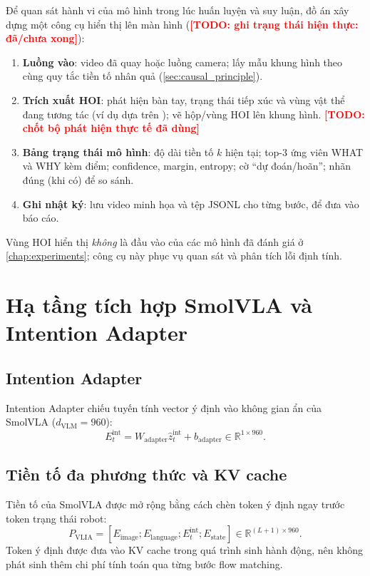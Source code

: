 \documentclass[12pt,a4paper]{report}
\newcommand{\TODO}[1]{\textcolor{red}{\textbf{[TODO: #1]}}}
\begin{document}
Để quan sát hành vi của mô hình trong lúc huấn luyện và suy luận, đồ án xây dựng một công cụ hiển thị lên màn hình (\TODO{ghi trạng thái hiện thực: đã/chưa xong}):
\begin{enumerate}
    \item \textbf{Luồng vào}: video đã quay hoặc luồng camera; lấy mẫu khung hình theo cùng quy tắc tiền tố nhân quả (\cref{sec:causal_principle}).
    \item \textbf{Trích xuất HOI}: phát hiện bàn tay, trạng thái tiếp xúc và vùng vật thể đang tương tác (ví dụ dựa trên \citep{shan2020100doh,zhang2020mediapipe}); vẽ hộp/vùng HOI lên khung hình. \TODO{chốt bộ phát hiện thực tế đã dùng}
    \item \textbf{Bảng trạng thái mô hình}: độ dài tiền tố $k$ hiện tại; top-3 ứng viên WHAT và WHY kèm điểm; confidence, margin, entropy; cờ ``dự đoán/hoãn''; nhãn đúng (khi có) để so sánh.
    \item \textbf{Ghi nhật ký}: lưu video minh họa và tệp JSONL cho từng bước, để đưa vào báo cáo.
\end{enumerate}
Vùng HOI hiển thị \emph{không} là đầu vào của các mô hình đã đánh giá ở \cref{chap:experiments}; công cụ này phục vụ quan sát và phân tích lỗi định tính.

\section{Hạ tầng tích hợp SmolVLA và Intention Adapter}

\subsection{Intention Adapter}
Intention Adapter chiếu tuyến tính vector ý định vào không gian ẩn của SmolVLA ($d_{\mathrm{VLM}}=960$):
\begin{equation}
    E_t^{\mathrm{int}} = W_{\mathrm{adapter}}\hat{z}_t^{\mathrm{int}} + b_{\mathrm{adapter}} \in \mathbb{R}^{1\times 960}.
\end{equation}

\subsection{Tiền tố đa phương thức và KV cache}
Tiền tố của SmolVLA được mở rộng bằng cách chèn token ý định ngay trước token trạng thái robot:
\begin{equation}
    P_{\mathrm{VLIA}} = \left[ E_{\mathrm{image}} ; E_{\mathrm{language}} ; E_t^{\mathrm{int}} ; E_{\mathrm{state}} \right] \in \mathbb{R}^{(L+1)\times 960}.
\end{equation}
Token ý định được đưa vào KV cache trong quá trình sinh hành động, nên không phát sinh thêm chi phí tính toán qua từng bước flow matching.
\end{document}
